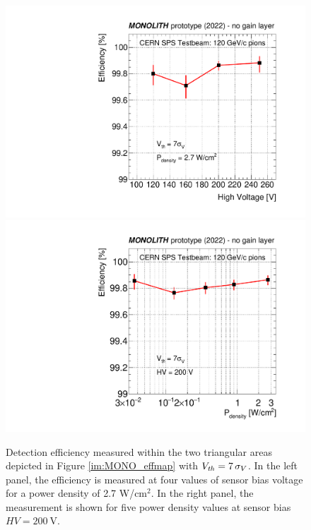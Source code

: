 		\begin{figure}[h]
			\centering 
			\includegraphics[width=.49\textwidth,trim=0 0 0 0]{files/MONOLITH_paper/eff_HV.pdf}
			\includegraphics[width=.49\textwidth,trim=0 0 0 0]{files/MONOLITH_paper/eff_power.pdf}
			\caption{Detection efficiency measured within the two triangular areas depicted in Figure \ref{im:MONO_effmap} with $V_{\mathrm {\it th}}=7~\!\sigma_V$. In the left panel, the efficiency is measured at four values of sensor bias voltage for a power density of 2.7 W/cm$^2$. In the right panel, the measurement is shown for five power density values at sensor bias $HV=\SI{200}{\volt}$.}
			\label{im:MONO_eff_ipream_HV_pscan}
		\end{figure}

